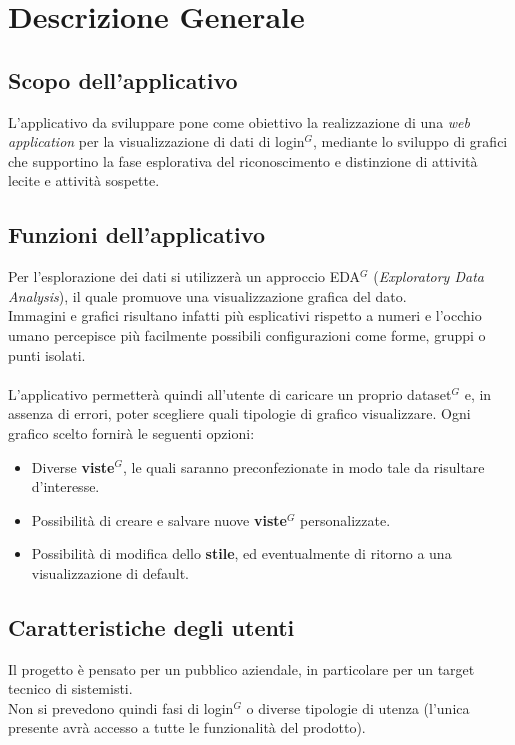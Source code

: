 \section{Descrizione Generale}
\subsection{Scopo dell'applicativo}

L'applicativo da sviluppare pone come obiettivo la realizzazione di una \textit{web application} per la visualizzazione di dati di login$^{G}$, mediante lo sviluppo di grafici che supportino la fase esplorativa del riconoscimento e distinzione di attività lecite e attività sospette.

\subsection{Funzioni dell'applicativo}

Per l'esplorazione dei dati si utilizzerà un approccio EDA$^{G}$ (\textit{Exploratory Data Analysis}), il quale promuove una visualizzazione grafica del dato.\\ 
Immagini e grafici risultano infatti più esplicativi rispetto a numeri e l'occhio umano percepisce più facilmente possibili configurazioni come forme, gruppi o punti isolati. \\ \\
L'applicativo permetterà quindi all'utente di caricare un proprio dataset$^{G}$ e, in assenza di errori, poter scegliere quali tipologie di grafico visualizzare. Ogni grafico scelto fornirà le seguenti opzioni:
\begin{itemize}
\item Diverse \textbf{viste$^{G}$}, le quali saranno preconfezionate in modo tale da risultare d'interesse.
\item Possibilità di creare e salvare nuove \textbf{viste$^{G}$} personalizzate.
\item Possibilità di modifica dello \textbf{stile}, ed eventualmente di ritorno a una visualizzazione di default.
\end{itemize}

\subsection{Caratteristiche degli utenti}

Il progetto è pensato per un pubblico aziendale, in particolare per un target tecnico di sistemisti.\\
Non si prevedono quindi fasi di login$^{G}$ o diverse tipologie di utenza (l'unica presente avrà accesso a tutte le funzionalità del prodotto).

